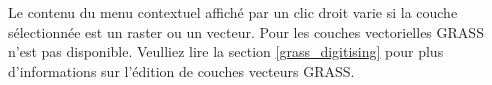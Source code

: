 Le contenu du menu contextuel affich\'e par un clic droit varie si la couche s\'electionn\'ee est un raster ou un vecteur. Pour les couches vectorielles GRASS  n'est pas disponible. Veulliez lire la section \ref{grass_digitising} pour plus d'informations sur l'\'edition de couches vecteurs GRASS.

%

